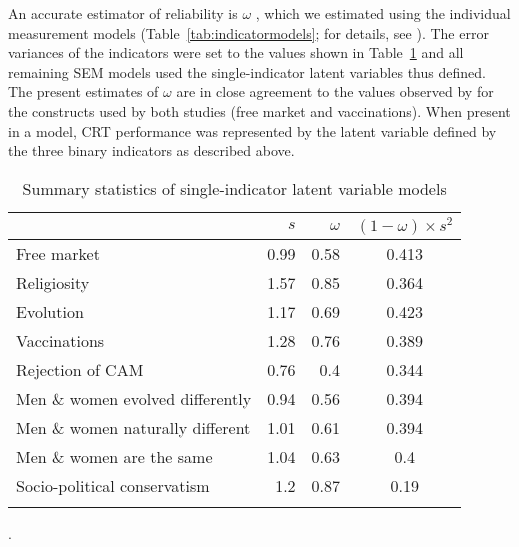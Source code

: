 \documentclass[fignum,man]{apa}\usepackage[]{graphicx}\usepackage[]{color}
\begin{document}
An accurate 
estimator of reliability 
is $\omega$ \cite{Komaroff97,Raykov97}, which
  we estimated using the individual measurement 
models (Table~\ref{tab:indicatormodels}; 
for details, see ).
The error variances of the indicators were set to 
the values shown in Table~\ref{tab:descriptives}
and all remaining SEM models used the single-indicator latent variables 
thus defined. 
The present estimates of $\omega$ are in close agreement to the values observed by 
 for the constructs used by both studies (free market and vaccinations). 
When present in a model, CRT performance was represented by the latent variable defined by the
three binary indicators as described above.

\begin{table} %
	\centering
	\caption{Summary statistics of single-indicator latent variable models}
	\label{tab:descriptives}

	\begin{tabular}{l r r c }
		\thickline
		\multicolumn{1}{c}{Construct}   & $s$ \tabfnm{\textit{a}}&  $\omega$ \tabfnm{\textit{b}}& $(1-\omega) \times s^2$ \tabfnm{\textit{c}} \\
		\hline
		Free market & 
		0.99 &
		0.58 &
		0.413 \\		
		
		Religiosity & 
		1.57 &
		0.85 &
		0.364 \\
		
		Evolution & 
		1.17 &
		0.69 &
		0.423 \\			
		
		Vaccinations & 
		1.28 &
		0.76 &
		0.389 \\		
		
        Rejection of CAM & 
		0.76 &
		0.4 &
		0.344 \\		
        
        
        Men \& women evolved differently & 
		0.94 &
		0.56 &
		0.394 \\		
        
        Men \& women naturally different & 
		1.01 &
		0.61 &
		0.394 \\		


		Men \& women are the same & 
		1.04 &
		0.63 &
		0.4 \\		
		
		Socio-political conservatism &
		1.2 &  %
		0.87 &
		0.19 \\		

		\thickline
	\end{tabular}
    .
\end{table}
\end{document}
